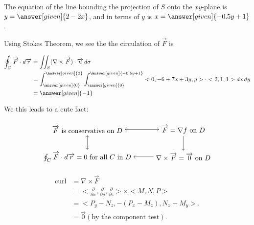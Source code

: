 \documentclass{ximera}
\begin{document}
\begin{example}
\begin{explanation}
The equation of the line bounding the projection of $S$ onto the $xy$-plane is $y = \answer[given]{2 - 2x}$, and in terms of $y$ is $x = \answer[given]{-0.5y + 1}$.

Using Stokes Theorem, we see the the circulation of $\overrightarrow{F}$ is 

    \begin{align*}
      \oint_C \overrightarrow{F} \cdot \d \overrightarrow{r} &= \iint_S (\nabla \times \overrightarrow{F}) \cdot \overrightarrow{n} \d \sigma \\
      &= \int_{\answer[given]{0}}^{\answer[given]{2}} \int_{\answer[given]{0}}^{\answer[given]{-0.5y + 1}} <0, -6 + 7x + 3y, y> \cdot <2,1,1> \d x \d y \\
      &=\answer[given]{-1}
    \end{align*}
\end{explanation}
\end{example}


We this leads to a cute fact:
\begin{fact}



\[
    \begin{tikzpicture}[every node/.style={midway}]
        \matrix[column sep={14em,between origins}, row sep={2em}] at (0,0) {
            \node(A) {$\overrightarrow{F}$ is conservative on $D$}; & \node(B) {$\overrightarrow{F} = \nabla f$ on $D$}; \\
            \node(C) {$\oint_C \overrightarrow{F}\cdot \d \overrightarrow{r} = 0$ for all $C$ in $D$}; & \node(D) {$\nabla \times \overrightarrow{F} = \overrightarrow{0}$ on $D$}; \\
        };

        \draw[<-] (C) -- (D) node[anchor=east]{};
        \draw[<->] (A) -- (B) node[anchor=south]{};
        \draw[->] (B) -- (D) node[anchor=west]{};
        \draw[<->] (A) -- (C) node[anchor=north]{};

    \end{tikzpicture}
\]

\begin{explanation}
    \begin{align*}
      \text{curl} &= \nabla \times \overrightarrow{F} \\
      &= <\frac{\partial}{\partial x}, \frac{\partial}{\partial y}, \frac{\partial}{\partial z}> \times <M, N, P> \\
      &= <P_y - N_z, -(P_x - M_z), N_x - M_y>.\\
      &= \overrightarrow{0} (\text{by the component test}).
    \end{align*}
\end{explanation}
\end{fact}


\end{document}
